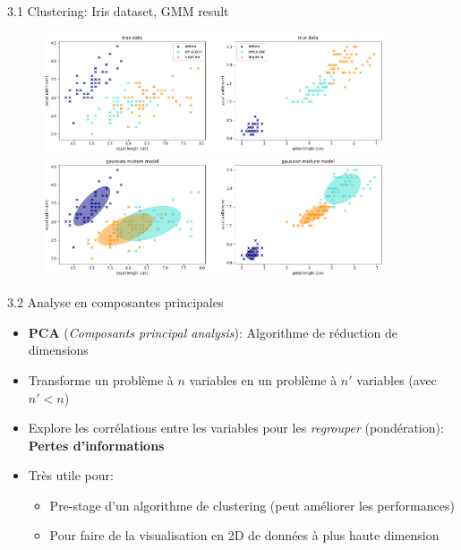 \begin{frame}{3.1 Clustering: Iris dataset, GMM result}
  \begin{figure}
    \includegraphics[width=0.9\textwidth]{fig/clusteringTrue.png}
    \includegraphics[width=0.9\textwidth]{fig/clusteringGMM.png}
  \end{figure}
\end{frame}

\begin{frame}{3.2 Analyse en composantes principales}
  \begin{itemize}
  \item \textbf{PCA} (\textit{Composants principal analysis}): Algorithme de réduction de dimensions
  \item Transforme un problème à $n$ variables en un problème à $n'$ variables (avec $n' < n$)
  \item Explore les corrélations entre les variables pour les \textit{regrouper} (pondération): \textbf{Pertes d'informations}
  \item Très utile pour:
    \begin{itemize}
      \normalsize
    \item Pre-stage d'un algorithme de clustering (peut améliorer les performances)
    \item Pour faire de la visualisation en 2D de données à plus haute dimension
    \end{itemize}
  \end{itemize}
\end{frame}

